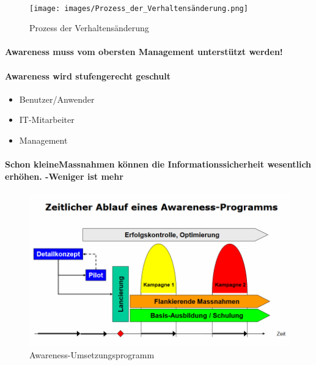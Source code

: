 \documentclass[10pt,a4paper]{article}
\begin{document}
\paragraph*{}
\begin{figure}[H]
    \begin{center}
    \texttt{[image: images/Prozess\_der\_Verhaltensänderung.png]}
    \caption{Prozess der Verhaltensänderung}
    \label{Prozess der Verhaltensaenderung}
    \end{center}
\end{figure}

\paragraph*{Awareness muss vom obersten Management unterstützt werden!}
\paragraph*{Awareness wird stufengerecht geschult}
\begin{itemize}[noitemsep,topsep=0pt,leftmargin=*]
    \item Benutzer/Anwender
    \item IT-Mitarbeiter
    \item Management
\end{itemize}
\paragraph*{Schon  	\flqq kleine\frqq  Massnahmen können die Informationssicherheit wesentlich erhöhen. -\frq  \flqq Weniger ist mehr\frqq}


\begin{figure}[H]
    \begin{center}
    \includegraphics[width=15cm]{images/Umsetzung_Awareness-Programm.png}
    \caption{Awareness-Umsetzungsprogramm}
    \label{Awareness-Umsetzungsprogramm}
    \end{center}
\end{figure}
\end{document}
